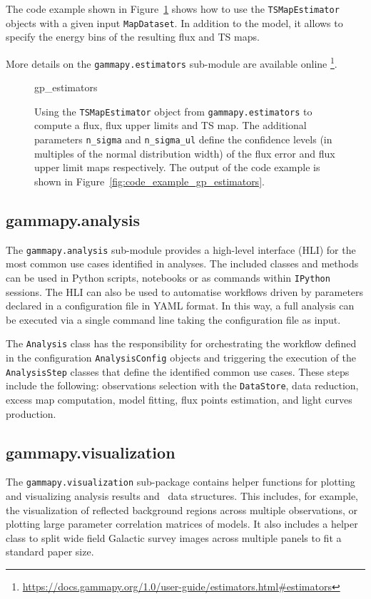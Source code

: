 \documentclass[longauth]{aa}
\newcommand{\code}[1]{\texttt{#1}}
\begin{document}
The code example shown in Figure~\ref{fig*:minted:gp_estimators} shows how to use
the \code{TSMapEstimator} objects with a given input \code{MapDataset}.
In addition to the model, it allows to specify the energy
bins of the resulting flux and TS maps.

More details on the \code{gammapy.estimators} sub-module are available online \footnote{\url{https://docs.gammapy.org/1.0/user-guide/estimators.html\#estimators}}.

\begin{figure}
	\small
	{gp_estimators}
	\caption{Using the \code{TSMapEstimator} object from \code{gammapy.estimators} to compute a
	 flux, flux upper limits and TS map. The additional parameters \code{n\_sigma}
        and \code{n\_sigma\_ul} define the confidence levels (in multiples of the normal distribution width)
        of the flux error and flux upper limit maps respectively. The output
		of the code example is shown in Figure~\ref{fig:code_example_gp_estimators}.
    }
    \label{fig*:minted:gp_estimators}
\end{figure}

\subsection{gammapy.analysis}
\label{ssec:gammapy-analysis}
The \code{gammapy.analysis} sub-module provides a high-level interface (HLI) for the most
common use cases identified in \gammaray analyses. The included classes and methods
 can be used in Python scripts, notebooks or as commands within \texttt{IPython}
sessions. The HLI can also be used to automatise
workflows driven by parameters declared in a configuration file in YAML format.
In this way, a full analysis can be executed via a single command line taking the
configuration file as input.

The \code{Analysis} class has the responsibility for orchestrating the workflow
defined in the configuration \code{AnalysisConfig} objects and triggering the execution of
the \code{AnalysisStep} classes that define the identified common use cases. These
steps include the following: observations selection with the \code{DataStore},  data
reduction, excess map computation, model fitting, flux points estimation, and
light curves production.

\subsection{gammapy.visualization}
\label{ssec:gammapy-visualization}
The \code{gammapy.visualization} sub-package contains helper functions
for plotting and visualizing analysis results and \gammapy~data structures.
This includes, for example, the visualization of reflected background regions across
multiple observations, or plotting large parameter correlation matrices of
\gammapy models. It also includes a helper class to split
wide field Galactic survey images across multiple panels to fit a standard
paper size.
\end{document}
